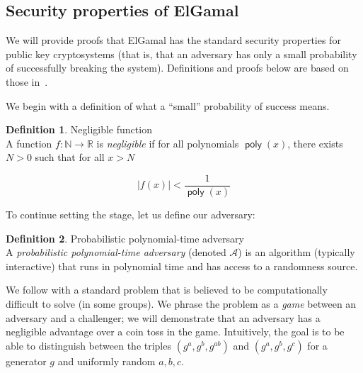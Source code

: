\documentclass[11pt,twoside,a4paper]{article}
\DeclareMathOperator{\poly}{\mathsf{poly}}
\theoremstyle{definition}
\newtheorem{definition}{Definition}[section]
\begin{document}
\subsection{Security properties of ElGamal}
We will provide proofs that ElGamal has the standard security properties for public key cryptosystems (that is, that an adversary has only a small probability of successfully breaking the system). Definitions and proofs below are based on those in~\cite{katz2014introduction}.

We begin with a definition of what a ``small'' probability of success means.
\begin{definition}{Negligible function}\\
    A function \(f:\mathbb{N}\rightarrow\mathbb{R}\) is \textit{negligible} if for all polynomials \(\poly(x)\), there exists \(N>0\) such that for all \(x>N\)

    \[|f(x)|<\frac{1}{\poly(x)}\]
\end{definition}

To continue setting the stage, let us define our adversary:
\begin{definition}{Probabilistic polynomial-time adversary}\\
    A \textit{probabilistic polynomial-time adversary} (denoted \(\mathcal{A}\)) is an algorithm (typically interactive) that runs in polynomial time and has access to a randomness source.
\end{definition}

We follow with a standard problem that is believed to be computationally difficult to solve (in some groups). We phrase the problem as a \textit{game} between an adversary and a challenger; we will demonstrate that an adversary has a negligible advantage over a coin toss in the game. Intuitively, the goal is to be able to distinguish between the triples \((g^a, g^b, g^{ab})\) and \((g^a, g^b, g^c)\) for  a generator \(g\) and uniformly random \(a, b, c\).
\end{document}
